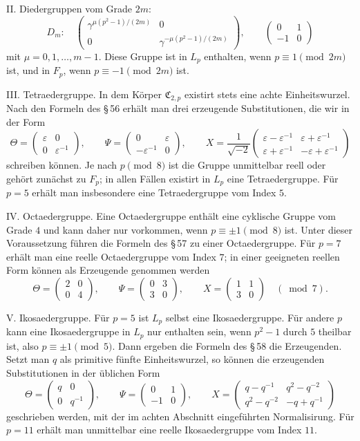 \documentclass[11pt]{article}
\providecommand{\mat}[4]{\begin{pmatrix}#1&#2\\#3&#4\end{pmatrix}}
\providecommand{\mat}[4]{\begin{pmatrix}#1&#2\\#3&#4\end{pmatrix}}
\providecommand{\Cfield}{\mathfrak C}
\begin{document}
II. Diedergruppen vom Grade $2m$:
\begin{equation}
 D_m:\quad
 \mat{\gamma^{\mu(p^2-1)/(2m)}}{0}{0}{\gamma^{-\mu(p^2-1)/(2m)}},
 \qquad
 \mat{0}{1}{-1}{0}
 \tag{5}
\end{equation}
mit $\mu=0,1,\ldots,m-1$. Diese Gruppe ist in $L_p$ enthalten, wenn $p\equiv1\pmod {2m}$ ist, und in $F_p$, wenn $p\equiv-1\pmod {2m}$ ist.

III. Tetraedergruppe. In dem Körper $\Cfield_{2,p}$ existirt stets eine achte Einheitswurzel. Nach den Formeln des \S\,56 erhält man drei erzeugende Substitutionen, die wir in der Form
\begin{equation}
 \Theta=\mat{\varepsilon}{0}{0}{\varepsilon^{-1}},\qquad
 \Psi=\mat{0}{\varepsilon}{-\varepsilon^{-1}}{0},\qquad
 X=\frac{1}{\sqrt{-2}}\mat{\varepsilon-\varepsilon^{-1}}{\varepsilon+\varepsilon^{-1}}{\varepsilon+\varepsilon^{-1}}{-\varepsilon+\varepsilon^{-1}}
 \tag{6}
\end{equation}
schreiben können. Je nach $p\pmod 8$ ist die Gruppe unmittelbar reell oder gehört zunächst zu $F_p$; in allen Fällen existirt in $L_p$ eine Tetraedergruppe. Für $p=5$ erhält man insbesondere eine Tetraedergruppe vom Index $5$.

IV. Octaedergruppe. Eine Octaedergruppe enthält eine cyklische Gruppe vom Grade $4$ und kann daher nur vorkommen, wenn $p\equiv\pm1\pmod8$ ist. Unter dieser Voraussetzung führen die Formeln des \S\,57 zu einer Octaedergruppe. Für $p=7$ erhält man eine reelle Octaedergruppe vom Index $7$; in einer geeigneten reellen Form können als Erzeugende genommen werden
\begin{equation}
 \Theta=\mat{2}{0}{0}{4},\qquad
 \Psi=\mat{0}{3}{3}{0},\qquad
 X=\mat{1}{1}{3}{0}
 \quad (\bmod 7).
 \tag{7}
\end{equation}

V. Ikosaedergruppe. Für $p=5$ ist $L_p$ selbst eine Ikosaedergruppe. Für andere $p$ kann eine Ikosaedergruppe in $L_p$ nur enthalten sein, wenn $p^2-1$ durch $5$ theilbar ist, also $p\equiv\pm1\pmod5$. Dann ergeben die Formeln des \S\,58 die Erzeugenden. Setzt man $q$ als primitive fünfte Einheitswurzel, so können die erzeugenden Substitutionen in der üblichen Form
\begin{equation}
 \Theta=\mat{q}{0}{0}{q^{-1}},\qquad
 \Psi=\mat{0}{1}{-1}{0},\qquad
 X=\mat{q-q^{-1}}{q^2-q^{-2}}{q^2-q^{-2}}{-q+q^{-1}}
 \tag{8}
\end{equation}
geschrieben werden, mit der im achten Abschnitt eingeführten Normalisirung. Für $p=11$ erhält man unmittelbar eine reelle Ikosaedergruppe vom Index $11$.
\end{document}
